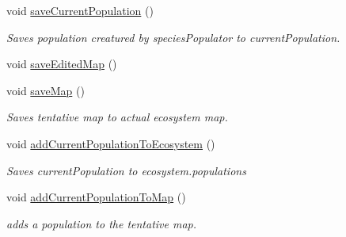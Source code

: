 \begin{DoxyCompactItemize}
void \mbox{\hyperlink{class_ecosystem_editor_a5df7d2d657419e3a35f2b55973f7c6ef}{save\+Current\+Population}} ()
\begin{DoxyCompactList}\small\item\em Saves population creatured by species\+Populator to current\+Population. \end{DoxyCompactList}\item 
void \mbox{\hyperlink{class_ecosystem_editor_a561f235d70f14111eba609e5d5ea869b}{save\+Edited\+Map}} ()
\item 
void \mbox{\hyperlink{class_ecosystem_editor_acfbb3166d4c0ef8567a36cf66b456141}{save\+Map}} ()
\begin{DoxyCompactList}\small\item\em Saves tentative map to actual ecosystem map. \end{DoxyCompactList}\item 
void \mbox{\hyperlink{class_ecosystem_editor_a8a9917b9c31e71e610d9e4b231930ce3}{add\+Current\+Population\+To\+Ecosystem}} ()
\begin{DoxyCompactList}\small\item\em Saves current\+Population to ecosystem.\+populations \end{DoxyCompactList}\item 
void \mbox{\hyperlink{class_ecosystem_editor_af6f631b9a71a8e1f7de9d48d18ddd08a}{add\+Current\+Population\+To\+Map}} ()
\begin{DoxyCompactList}\small\item\em adds a population to the tentative map. \end{DoxyCompactList}\end{DoxyCompactItemize}

